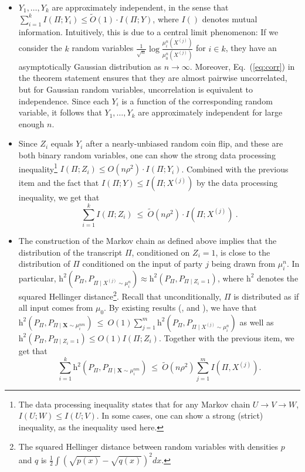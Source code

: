 \documentclass[final, 12pt]{colt2018}
\providecommand{\helli}{\mathrm{h}}
\renewcommand{\eqref}[1]{Eq.~(\ref{#1})}
\begin{document}
\begin{itemize}[leftmargin=*]
\item $Y_1,\ldots,Y_k$ are approximately independent, in the sense that $\sum_{i=1}^{k}I(\Pi;Y_i)\leq \tilde{O}(1)\cdot I(\Pi;Y)$, where $I()$ denotes mutual information. Intuitively, this is due to a central limit phenomenon: If we consider the $k$ random variables $\frac{1}{\sqrt{n}}\log\frac{\mu_i^n\left(X^{(j)}\right)}{\mu_0^n\left(X^{(j)}\right)}$ for $i\in k$, they have an asymptotically Gaussian distribution as $n\rightarrow \infty$. Moreover, \eqref{eq:corr} in the theorem statement ensures that they are almost pairwise uncorrelated, but for Gaussian random variables, uncorrelation is equivalent to independence. Since each $Y_i$ is a function of the corresponding random variable, it follows that $Y_1,\ldots,Y_k$ are approximately independent for large enough $n$. 

\item Since $Z_i$ equals $Y_i$ after a nearly-unbiased random coin flip, and these are both binary random variables, one can show the strong data processing inequality\footnote{The data processing inequality states that for any Markov chain $U \to V \to W$, $I(U;W) \le I(U;V)$. In some cases, one can show a strong (strict) inequality, as the inequality used here.} $I(\Pi;Z_i)\leq O(n\rho^2)\cdot I(\Pi;Y_i)$. Combined with the previous item and the fact that $I(\Pi;Y)\leq I\left(\Pi;X^{(j)}\right)$ by the data processing inequality, we get that
\[
\sum_{i=1}^{k}I(\Pi;Z_i)~\leq~\tilde{O}(n\rho^2)\cdot I(\Pi;X^{(j)})~.
\]

\item The construction of the Markov chain as defined above implies that the distribution of the transcript $\Pi$, conditioned on $Z_i=1$, is close to the distribution of $\Pi$ conditioned on the input of party $j$ being drawn from $\mu_i^n$. In particular, $\helli^2(P_{\Pi}, P_{\Pi \mid X^{(j)} \sim \mu_i^n}) \approx \helli^2(P_{\Pi}, P_{\Pi \mid Z_i=1})$, where $\helli^2$ denotes the squared Hellinger distance\footnote{The squared Hellinger distance between random variables with densities $p$ and $q$ is $\frac{1}{2} \int\left( \sqrt{p(x)} - \sqrt{q(x)}\right)^2 dx$.}. Recall that unconditionally, $\Pi$ is distributed as if all input comes from $\mu_0$. By existing results (\citet[Lemma~6.2]{bar2004information}, \citet[Lemma~2]{braverman2016communication} and \cite{jayram2009hellinger}), we have that $\helli^2(P_{\Pi}, P_{\Pi \mid \mathbf{X} \sim \mu_i^{nm}}) ~\le~ O(1)\sum_{j=1}^m \helli^2(P_{\Pi}, P_{\Pi \mid X^{(j)} \sim \mu_i^n})$ as well as $\helli^2(P_{\Pi}, P_{\Pi \mid Z_i=1})\leq O(1)I(\Pi;Z_i)$. Together with the previous item, we get that
\begin{equation}\label{eq:sketchend}
\sum_{i=1}^{k}\helli^2(P_{\Pi}, P_{\Pi \mid \mathbf{X} \sim \mu_i^{nm}}) ~\le~ 
\tilde{O}(n\rho^2)\sum_{j=1}^{m} I(\Pi,X^{(j)}).
\end{equation}
\end{itemize}
\end{document}
